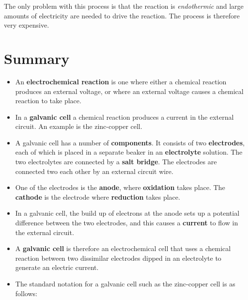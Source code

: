 The only problem with this process is that the reaction is \textit{endothermic} and large amounts of electricity are needed to drive the reaction. The process is therefore very expensive.

\section{Summary}

\begin{itemize}
\item{An \textbf{electrochemical reaction} is one where either a chemical reaction produces an external voltage, or where an external voltage causes a chemical reaction to take place.}
\item{In a \textbf{galvanic cell} a chemical reaction produces a current in the external circuit. An example is the zinc-copper cell.}
\item{A galvanic cell has a number of \textbf{components}. It consists of two \textbf{electrodes}, each of which is placed in a separate beaker in an \textbf{electrolyte} solution. The two electrolytes are connected by a \textbf{salt bridge}. The electrodes are connected two each other by an external circuit wire.}
\item{One of the electrodes is the \textbf{anode}, where \textbf{oxidation} takes place. The \textbf{cathode} is the electrode where \textbf{reduction} takes place.}
\item{In a galvanic cell, the build up of electrons at the anode sets up a potential difference between the two electrodes, and this causes a \textbf{current} to flow in the external circuit.}   
\item{A \textbf{galvanic cell} is therefore an electrochemical cell that uses a chemical reaction between two dissimilar electrodes dipped in an electrolyte to generate an electric current.}
\item{The standard notation for a galvanic cell such as the zinc-copper cell is as follows:

}
\end{itemize}
